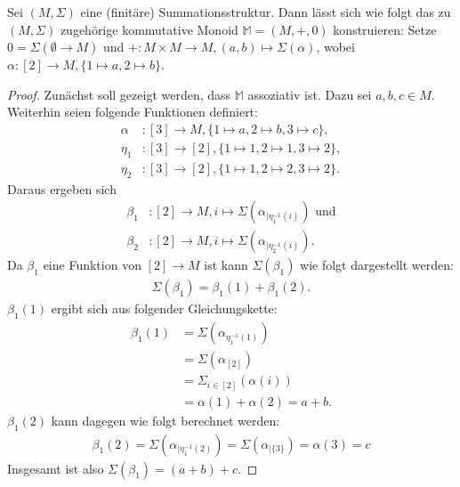 \documentclass{article}
\begin{document}
\begin{theorem}\label{Theorem_SummationMonoid}
  Sei $(M, \Sigma)$ eine (finitäre) Summationsstruktur.
  Dann lässt sich wie folgt das zu $(M, \Sigma)$ zugehörige kommutative Monoid $\mathbb{M} = (M, +, 0)$ konstruieren:
  Setze $0 = \Sigma(\emptyset \to M)$ und
  $+ \colon M \times M \to M, (a, b) \mapsto \Sigma(\alpha)$, wobei
  $\alpha \colon [2] \to M, \{ 1 \mapsto a, 2 \mapsto b\}$.
\end{theorem}
\begin{proof}
  Zunächst soll gezeigt werden, dass $\mathbb{M}$ assoziativ ist.
  Dazu sei $a,b,c \in M$. Weiterhin seien folgende Funktionen definiert:
  \begin{align*}
    \alpha &\colon [3] \to M, \{ 1 \mapsto a, 2 \mapsto b, 3 \mapsto c \},\\
    \eta_1 &\colon [3] \to [2], \{ 1 \mapsto 1, 2 \mapsto 1, 3 \mapsto 2 \},\\
    \eta_2 &\colon [3] \to [2], \{ 1 \mapsto 1, 2 \mapsto 2, 3 \mapsto 2 \}.
  \end{align*}
  Daraus ergeben sich 
  \begin{align*}
    \beta_1 &\colon [2] \to M, i \mapsto \Sigma(\alpha_{\mid \eta_1^{-1}(i)}) \text{ und}\\
    \beta_2 &\colon [2] \to M, i \mapsto \Sigma(\alpha_{\mid \eta_2^{-1}(i)}).
  \end{align*}
  Da $\beta_1$ eine Funktion von $[2] \to M$ ist kann $\Sigma(\beta_1)$ wie folgt dargestellt werden:
  \begin{align*}
    \Sigma(\beta_1) = \beta_1(1) + \beta_1(2).
  \end{align*}
  $\beta_1(1)$ ergibt sich aus folgender Gleichungskette:
  \begin{align*}
    \beta_1(1) &= \Sigma(\alpha_{\eta_1^{-1}(1)})\\
    &= \Sigma(\alpha_{[2]})\\
    &= \Sigma_{i \in [2]}(\alpha(i))\\ 
    &= \alpha(1) + \alpha(2) = a + b.
  \end{align*}
  $\beta_1(2)$ kann dagegen wie folgt berechnet werden:
  \begin{align*}
    \beta_1(2) = \Sigma(\alpha_{\mid \eta_1^{-1}(2)})
    = \Sigma(\alpha_{\mid \{3\}})
    = \alpha(3) = c
  \end{align*}
  Insgesamt ist also $\Sigma(\beta_1) = (a + b) + c$.
  

\end{proof}
\end{document}
